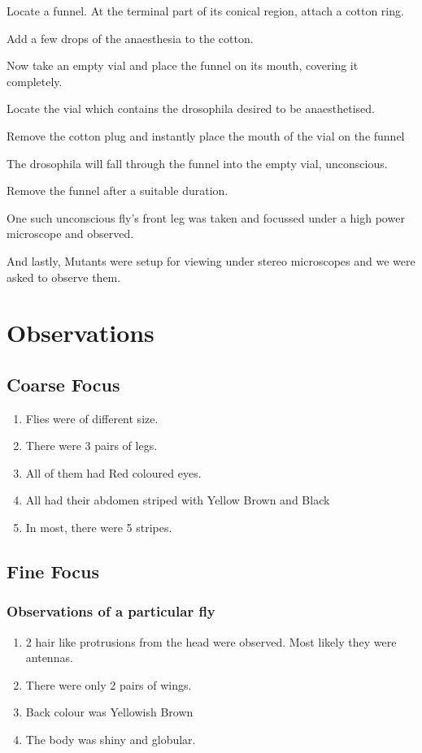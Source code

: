 	\begin{aenumerate}
		\item Locate a funnel. At the terminal part of its conical region, attach a cotton ring.
		\item Add a few drops of the anaesthesia to the cotton.
		\item Now take an empty vial and place the funnel on its mouth, covering it completely.
		\item Locate the vial which contains the drosophila desired to be anaesthetised.
		\item Remove the cotton plug and instantly place the mouth of the vial on the funnel
		\item The drosophila will fall through the funnel into the empty vial, unconscious.
		\item Remove the funnel after a suitable duration.
	\end{aenumerate}
	One such unconscious fly's front leg was taken and focussed under a high power microscope and observed.
	\par
	And lastly, Mutants were setup for viewing under stereo microscopes and we were asked to observe them.
\section{Observations}
	\subsection{Coarse Focus}
		\begin{enumerate}
			\item Flies were of different size.
			\item There were 3 pairs of legs.
			\item All of them had Red coloured eyes.
			\item All had their abdomen striped with Yellow Brown and Black
			\item In most, there were 5 stripes.
		\end{enumerate}

	\subsection{Fine Focus}
		
		\subsubsection*{Observations of a particular fly}
			\begin{enumerate}
				\item 2 hair like protrusions from the head were observed. Most likely they were antennas.
				\item There were only 2 pairs of wings.
				\item Back colour was Yellowish Brown
				\item The body was shiny and globular.
			\end{enumerate}
		
